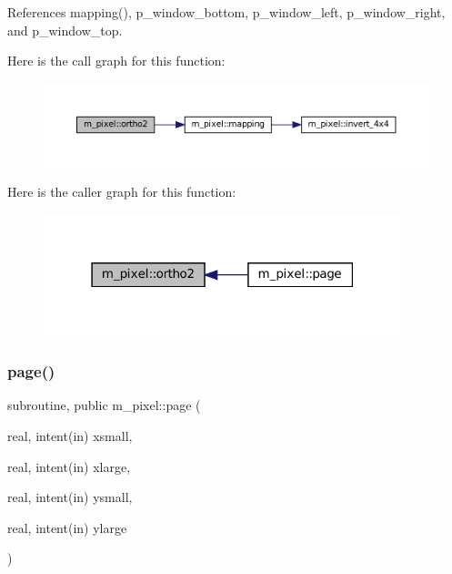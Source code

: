 References mapping(), p\+\_\+window\+\_\+bottom, p\+\_\+window\+\_\+left, p\+\_\+window\+\_\+right, and p\+\_\+window\+\_\+top.

Here is the call graph for this function\+:
\nopagebreak
\begin{figure}[H]
\begin{center}
\leavevmode
\includegraphics[width=350pt]{namespacem__pixel_a80dece6adac704024a5a76efee697770_cgraph}
\end{center}
\end{figure}
Here is the caller graph for this function\+:
\nopagebreak
\begin{figure}[H]
\begin{center}
\leavevmode
\includegraphics[width=295pt]{namespacem__pixel_a80dece6adac704024a5a76efee697770_icgraph}
\end{center}
\end{figure}
\mbox{\label{namespacem__pixel_a6733a8657ca9f51b2648690dbae258c9}} 
\subsubsection{\texorpdfstring{page()}{page()}}
{\footnotesize\ttfamily subroutine, public m\+\_\+pixel\+::page (\begin{DoxyParamCaption}\item[{real, intent(in)}]{xsmall,  }\item[{real, intent(in)}]{xlarge,  }\item[{real, intent(in)}]{ysmall,  }\item[{real, intent(in)}]{ylarge }\end{DoxyParamCaption})}



